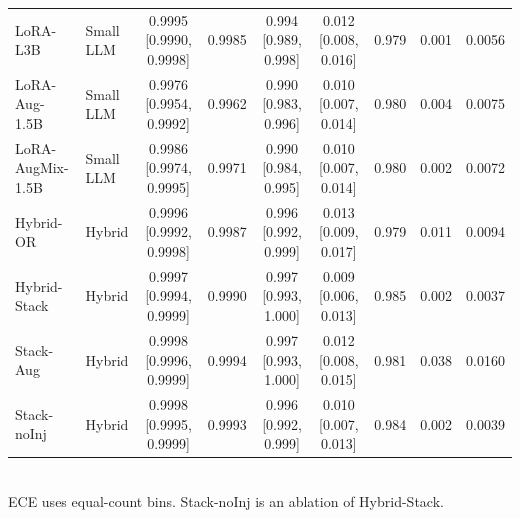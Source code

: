 \begin{table}[t]
\begin{tabular}{llccccccc}
LoRA-L3B & Small LLM & 0.9995 [0.9990, 0.9998] & 0.9985 & 0.994 [0.989, 0.998] & 0.012 [0.008, 0.016] & 0.979 & 0.001 & 0.0056 \\
LoRA-Aug-1.5B & Small LLM & 0.9976 [0.9954, 0.9992] & 0.9962 & 0.990 [0.983, 0.996] & 0.010 [0.007, 0.014] & 0.980 & 0.004 & 0.0075 \\
LoRA-AugMix-1.5B & Small LLM & 0.9986 [0.9974, 0.9995] & 0.9971 & 0.990 [0.984, 0.995] & 0.010 [0.007, 0.014] & 0.980 & 0.002 & 0.0072 \\
Hybrid-OR & Hybrid & 0.9996 [0.9992, 0.9998] & 0.9987 & 0.996 [0.992, 0.999] & 0.013 [0.009, 0.017] & 0.979 & 0.011 & 0.0094 \\
Hybrid-Stack & Hybrid & 0.9997 [0.9994, 0.9999] & 0.9990 & 0.997 [0.993, 1.000] & 0.009 [0.006, 0.013] & 0.985 & 0.002 & 0.0037 \\
Stack-Aug & Hybrid & 0.9998 [0.9996, 0.9999] & 0.9994 & 0.997 [0.993, 1.000] & 0.012 [0.008, 0.015] & 0.981 & 0.038 & 0.0160 \\
Stack-noInj & Hybrid & 0.9998 [0.9995, 0.9999] & 0.9993 & 0.996 [0.992, 0.999] & 0.010 [0.007, 0.013] & 0.984 & 0.002 & 0.0039 \\
\bottomrule
\end{tabular}
\\[2pt]{\scriptsize ECE uses equal-count bins. Stack-noInj is an ablation of Hybrid-Stack.}
\end{table}